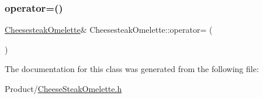 \subsubsection{\texorpdfstring{operator=()}{operator=()}}
{\footnotesize\ttfamily \mbox{\hyperlink{classCheesesteakOmelette}{Cheesesteak\+Omelette}}\& Cheesesteak\+Omelette\+::operator= (\begin{DoxyParamCaption}\item[{const \mbox{\hyperlink{classCheesesteakOmelette}{Cheesesteak\+Omelette}} \&}]{ }\end{DoxyParamCaption})}



The documentation for this class was generated from the following file\+:\begin{DoxyCompactItemize}
\item 
Product/\mbox{\hyperlink{CheeseSteakOmelette_8h}{Cheese\+Steak\+Omelette.\+h}}\end{DoxyCompactItemize}
